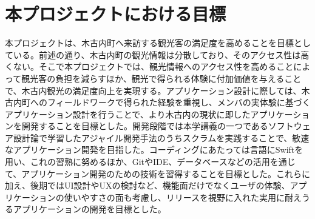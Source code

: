 \section{本プロジェクトにおける目標}

本プロジェクトは、木古内町へ来訪する観光客の満足度を高めることを目標としている。前述の通り、木古内町の観光情報は分散しており、そのアクセス性は高くない。そこで本プロジェクトでは、観光情報へのアクセス性を高めることによって観光客の負担を減らすほか、観光で得られる体験に付加価値を与えることで、木古内観光の満足度向上を実現する。アプリケーション設計に際しては、木古内町へのフィールドワークで得られた経験を重視し、メンバの実体験に基づくアプリケーション設計を行うことで、より木古内の現状に即したアプリケーションを開発することを目標とした。開発段階では本学講義の一つであるソフトウェア設計論で学習したアジャイル開発手法のうちスクラムを実践することで、敏速なアプリケーション開発を目指した。コーディングにあたっては言語にSwiftを用い、これの習熟に努めるほか、GitやIDE、データベースなどの活用を通じて、アプリケーション開発のための技術を習得することを目標とした。これらに加え、後期ではUI設計やUXの検討など、機能面だけでなくユーザの体験、アプリケーションの使いやすさの面も考慮し、リリースを視野に入れた実用に耐えうるアプリケーションの開発を目標とした。

